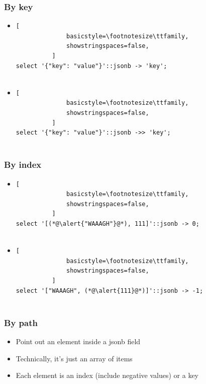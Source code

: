 \documentclass[14pt, compress]{beamer}
\begin{document}
\begin{frame}[fragile]
  \frametitle{By key}

  \begin{itemize}
      \item
          \begin{lstlisting}[
              basicstyle=\footnotesize\ttfamily,
              showstringspaces=false,
          ]
select '{"key": "value"}'::jsonb -> 'key';
         
          \end{lstlisting}

      \item
          \begin{lstlisting}[
              basicstyle=\footnotesize\ttfamily,
              showstringspaces=false,
          ]
select '{"key": "value"}'::jsonb ->> 'key';
         
          \end{lstlisting}

  \end{itemize}

\end{frame}

\begin{frame}[fragile]
  \frametitle{By index}

  \begin{itemize}
      \item
          \begin{lstlisting}[
              basicstyle=\footnotesize\ttfamily,
              showstringspaces=false,
          ]
select '[(*@\alert{"WAAAGH"}@*), 111]'::jsonb -> 0;
         
          \end{lstlisting}

      \item
          \begin{lstlisting}[
              basicstyle=\footnotesize\ttfamily,
              showstringspaces=false,
          ]
select '["WAAAGH", (*@\alert{111}@*)]'::jsonb -> -1;
         
          \end{lstlisting}

  \end{itemize}

\end{frame}

\begin{frame}[fragile]
  \frametitle{By path}

  \begin{itemize}
      \item[\MVRightarrow] Point out an element inside a jsonb field
      \item[\MVRightarrow] Technically, it's just an array of items
      \item[\MVRightarrow] Each element is an index (include negative values) or a key
  \end{itemize}

\end{frame}
\end{document}
